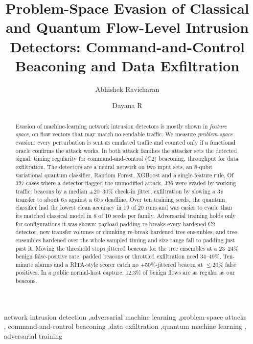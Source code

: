 \documentclass[preprint,12pt]{elsarticle}
\begin{document}
\begin{frontmatter}

\title{Problem-Space Evasion of Classical and Quantum Flow-Level Intrusion Detectors:
Command-and-Control Beaconing and Data Exfiltration}


\author{Abhishek Ravicharan}

\author{Dayana R}



\begin{abstract}
Evasion of machine-learning network intrusion detectors is mostly shown in \emph{feature space}, on
flow vectors that may match no sendable traffic. We measure \emph{problem-space}
evasion: every perturbation is sent as emulated traffic and counted only if a functional
oracle confirms the attack works. In both attack families the attacker
sets the detected signal: timing regularity for command-and-control (C2) beaconing, throughput for data
exfiltration. The detectors are a neural network on two input sets, an
8-qubit variational quantum classifier, Random Forest, XGBoost and a single-feature rule. Of 327 cases
where a detector flagged the unmodified attack, 326 were evaded by working traffic: beacons by a
median $\pm$20--30\% check-in jitter, exfiltration by slowing a 3\,s transfer to about 6\,s against a
60\,s deadline. Over ten training seeds, the quantum classifier had the lowest clean accuracy in 19 of
20 runs and was easier to evade than its matched classical model in 8 of 10 seeds per family.
Adversarial training holds only for configurations it was shown: payload padding re-breaks every
hardened C2 detector, new transfer volumes or chunking re-break hardened tree ensembles, and tree
ensembles hardened over the whole sampled timing and size range fall to padding just past it. Moving
the threshold stops jittered beacons for the tree ensembles at a 23--24\% benign false-positive rate;
padded beacons or throttled exfiltration need 34--49\%. Ten-minute alarms and a RITA-style scorer catch no
$\pm$50\%-jittered beacon at $\le$20\% false positives. In a public normal-host capture, 12.3\% of benign flows are as regular as our beacons.
\end{abstract}

\begin{keyword}
network intrusion detection \sep adversarial machine learning \sep problem-space attacks \sep
command-and-control beaconing \sep data exfiltration \sep quantum machine learning \sep
adversarial training
\end{keyword}

\end{frontmatter}
\end{document}
